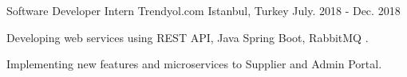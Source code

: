 \begin{cventries}
{\begin{cvitems}
      \end{cvitems}
    }
  \cventry
   {Software Developer Intern} %
    {Trendyol.com} %
    {Istanbul, Turkey} %
    {July. 2018 - Dec. 2018} %
    {
      \begin{cvitems} %
		\item {Developing web services using REST API, Java Spring Boot, RabbitMQ .}
        \item {Implementing new features and microservices to Supplier and Admin Portal.}
      \end{cvitems}
    }

\begin{comment}
  \cventry
    {Work \& Study} %
    {Koc University, Computer Information Technology Department} %
    {Istanbul, Turkey} %
    {OCt. 2015 - May. 2016} %
    {
      \begin{cvitems} %
        \item {Applied and tested Google Cloud technologies across the campus.}
      \end{cvitems}
    }

\end{comment}
\end{cventries}

